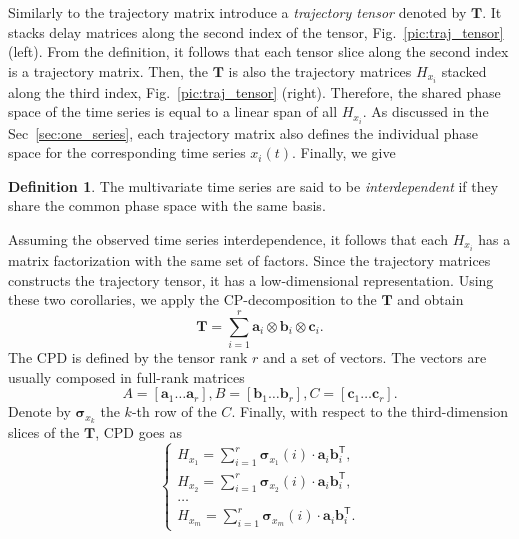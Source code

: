 \documentclass[referee, pdflatex, sn-mathphys-num]{sn-jnl}
\theoremstyle{definition}
\newtheorem{Def}{Definition}
\theoremstyle{plain}
\begin{document}
	Similarly to the trajectory matrix introduce a \textit{trajectory tensor} denoted by $ \mathbf{T} $. It stacks delay matrices along the second index of the tensor, Fig.~\ref{pic:traj_tensor} (left). From the definition, it follows that each tensor slice along the second index is a trajectory matrix. Then, the $ \mathbf{T} $ is also the trajectory matrices $ H_{x_i} $ stacked along the third index, Fig.~\ref{pic:traj_tensor} (right). Therefore, the shared phase space of the time series is equal to a linear span of all $ H_{x_i} $. As discussed in the Sec~\ref{sec:one_series}, each trajectory matrix also defines the individual phase space for the corresponding time series $ x_i(t) $. Finally, we give
	
	\begin{Def}\label{def:interdepend}	
		The multivariate time series are said to be \emph{interdependent} if they share the common phase space with the same basis.
	\end{Def}
	
	Assuming the observed time series interdependence, it follows that each $ H_{x_i} $ has a matrix factorization with the same set of factors. Since the trajectory matrices constructs the trajectory tensor, it has a low-dimensional representation. Using these two corollaries, we apply the CP-decomposition to the $ \mathbf{T} $ and obtain \begin{equation}\label{eq:CPD}
		\mathbf{T} = \sum\limits_{i = 1}^{r} \mathbf{a}_i \otimes \mathbf{b}_i \otimes \mathbf{c}_i .
	\end{equation} The CPD is defined by the tensor rank $ r $ and a set of vectors. The vectors are usually composed in full-rank matrices \begin{equation}\label{eq:cpd_matrices}
		A = [\mathbf{a}_1 \ldots \mathbf{a}_r], B = [\mathbf{b}_1 \ldots \mathbf{b}_r], C = [\mathbf{c}_1 \ldots \mathbf{c}_r] .
	\end{equation} Denote by $ \boldsymbol{\sigma}_{x_k} $ the $ k $-th row of the $ C $. Finally, with respect to the third-dimension slices of the $ \mathbf{T} $, CPD goes as \begin{equation}\label{eq:tSSA_decomp}
		\begin{cases}
			H_{x_1} = \sum\limits_{i = 1}^{r} \boldsymbol{\sigma}_{x_1}(i) \cdot \mathbf{a}_i  \mathbf{b}_i^{\mathsf{T}},  \\
			H_{x_2} = \sum\limits_{i = 1}^{r} \boldsymbol{\sigma}_{x_2}(i) \cdot \mathbf{a}_i  \mathbf{b}_i^{\mathsf{T}}, \\
			\ldots \\
			H_{x_m} = \sum\limits_{i = 1}^{r} \boldsymbol{\sigma}_{x_m}(i) \cdot \mathbf{a}_i  \mathbf{b}_i^{\mathsf{T}} .
		\end{cases}
	\end{equation}
	
\end{document}
